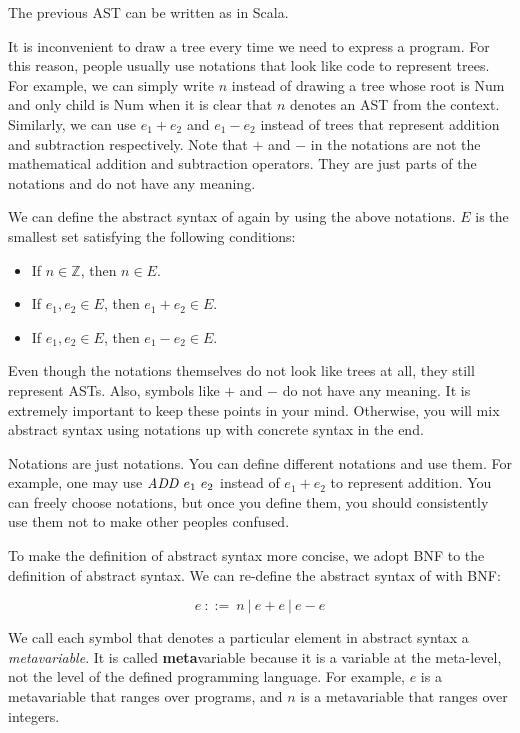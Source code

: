 The previous AST can be written as  in Scala.

It is inconvenient to draw a tree every time we need to express a program. For
this reason, people usually use notations that look like code to represent
trees. For example, we can simply write $n$ instead of drawing a tree whose root
is Num and only child is Num when it is clear that $n$ denotes an AST
from the context. Similarly, we can use $e_1+e_2$ and $e_1-e_2$
instead of trees that represent addition and subtraction respectively. Note that
$+$ and $-$ in the notations are not the mathematical addition and subtraction
operators. They are just parts of the notations and do not have any meaning.

We can define the abstract syntax of \lang again by using the above notations.
$E$ is the smallest set satisfying the following conditions:

\begin{itemize}
  \item If $n\in\mathbb{Z}$, then $n\in E$.
  \item If $e_1,e_2\in E$, then $e_1+e_2\in E$.
  \item If $e_1,e_2\in E$, then $e_1-e_2\in E$.
\end{itemize}

Even though the notations themselves do not look like trees at all, they still
represent ASTs. Also, symbols like $+$ and $-$ do not have any meaning. It
is extremely important to keep these points in your mind. Otherwise, you will
mix abstract syntax using notations up with concrete syntax in the end.

Notations are just notations. You can define different notations and use them.
For example, one may use $\mbox{\emph{ADD}}\ e_1\ e_2$ instead of $e_1 + e_2$ to represent
addition. You can freely choose notations, but once you define them, you should
consistently use them not to make other peoples confused.

To make the definition of abstract syntax more concise, we adopt BNF to the
definition of abstract syntax. We can re-define the abstract syntax of \lang with
BNF:

\[e\ ::=\ n\ |\ e+e\ |\ e-e\]

We call each symbol that denotes a particular element in abstract syntax a
\textit{metavariable}.
It is called \textbf{meta}variable because it is a variable at the
meta-level, not the level of the defined programming language. For example, $e$
is a metavariable that ranges over programs, and $n$ is a metavariable that
ranges over integers.

